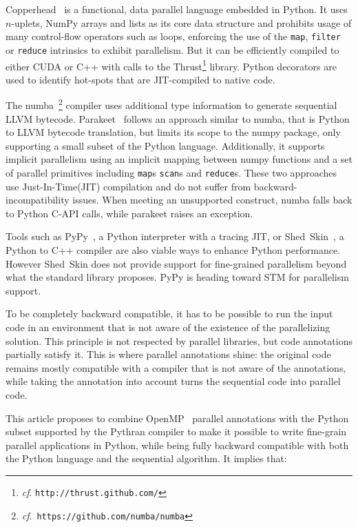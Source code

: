 \documentclass[conference]{IEEEtran}
\begin{document}
Copperhead~\cite{copperhead2011} is a functional, data parallel language
embedded in Python. It uses $n$-uplets, NumPy arrays and lists as its core data
structure and prohibits usage of many control-flow operators such as loops,
enforcing the use of the \texttt{map}, \texttt{filter} or \texttt{reduce}
intrinsics to exhibit parallelism. But it can be efficiently compiled to either
CUDA or C++ with calls to the Thrust\footnote{\emph{cf}.
\texttt{http://thrust.github.com/}} library. Python decorators are used to
identify hot-spots that are JIT-compiled to native code.

The numba~\footnote{\emph{cf}.\ \texttt{https://github.com/numba/numba}}
compiler uses additional type information to generate sequential LLVM bytecode.
Parakeet~\cite{parakeet2012} follows an approach similar to numba, that is
Python to LLVM bytecode translation, but limits its scope to the numpy package,
only supporting a small subset of the Python language. Additionally, it supports
implicit parallelism using an implicit mapping between numpy functions and a set
of parallel primitives including \texttt{map}s \texttt{scan}s and
\texttt{reduce}s. These two approaches use Just-In-Time(JIT) compilation and do
not suffer from backward-incompatibility issues. When meeting an unsupported
construct, numba falls back to Python C-API calls, while parakeet raises an
exception.

Tools such as PyPy~\cite{pypy2009}, a Python interpreter with a tracing JIT, or
Shed~Skin~\cite{shedskin2006}, a Python to C++ compiler are also viable ways to
enhance Python performance. However Shed~Skin does not provide support for
fine-grained parallelism beyond what the standard library proposes. PyPy is
heading toward STM for parallelism support.

To be completely backward compatible, it has to be possible to run the input
code in an environment that is not aware of the existence of the parallelizing
solution. This principle is not respected by parallel libraries, but code
annotations partially satisfy it. This is where parallel annotations shine: the
original code remains mostly compatible with a compiler that is not aware of the
annotations, while taking the annotation into account turns the sequential code
into parallel code.

This article proposes to combine OpenMP~\cite{openmp3.1} parallel annotations
with the Python subset supported by the Pythran compiler to make it possible to
write fine-grain parallel applications in Python, while being fully backward
compatible with both the Python language and the sequential algorithm. It
implies that:
\end{document}
